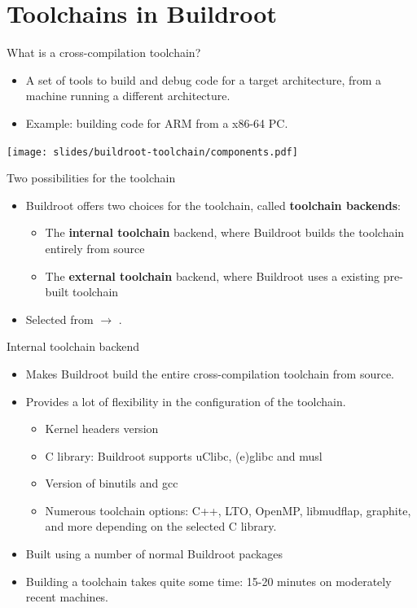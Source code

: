 \section{Toolchains in Buildroot}

\begin{frame}{What is a cross-compilation toolchain?}
  \begin{itemize}
  \item A set of tools to build and debug code for a target
    architecture, from a machine running a different architecture.
  \item Example: building code for ARM from a x86-64 PC.
  \end{itemize}
  \begin{center}
    \texttt{[image: slides/buildroot-toolchain/components.pdf]}
  \end{center}
\end{frame}

\begin{frame}{Two possibilities for the toolchain}
  \begin{itemize}
  \item Buildroot offers two choices for the toolchain, called {\bf
      toolchain backends}:
    \begin{itemize}
    \item The {\bf internal toolchain} backend, where Buildroot builds
      the toolchain entirely from source
    \item The {\bf external toolchain} backend, where Buildroot uses a
      existing pre-built toolchain
    \end{itemize}
  \item Selected from  $\rightarrow$ .
  \end{itemize}
\end{frame}

\begin{frame}{Internal toolchain backend}
  \begin{itemize}
  \item Makes Buildroot build the entire cross-compilation toolchain
    from source.
  \item Provides a lot of flexibility in the configuration of the
    toolchain.
    \begin{itemize}
    \item Kernel headers version
    \item C library: Buildroot supports uClibc, (e)glibc and musl
    \item Version of binutils and gcc
    \item Numerous toolchain options: C++, LTO, OpenMP, libmudflap,
      graphite, and more depending on the selected C library.
    \end{itemize}
  \item Built using a number of normal Buildroot packages
  \item Building a toolchain takes quite some time: 15-20 minutes on
    moderately recent machines.
  \end{itemize}
\end{frame}

